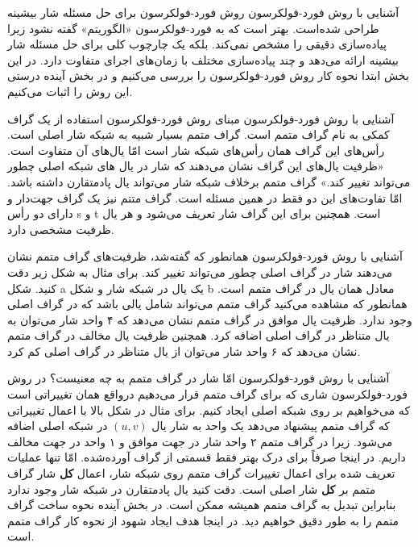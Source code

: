 
\begin{itemframe}{آشنایی با روش فورد-فولکرسون}
\itm
روش فورد-فولکرسون
برای حل مسئله شار بیشینه طراحی شده‌است. بهتر است که به فورد-فولکرسون «الگوریتم» گفته نشود زیرا پیاده‌سازی دقیقی را مشخص نمی‌کند. بلکه یک چارچوب کلی برای حل مسئله شار بیشینه ارائه می‌دهد و چند پیاده‌سازی مختلف با زمان‌های اجرای متفاوت دارد.
\itm
در این بخش ابتدا نحوه کار روش فورد-فولکرسون را بررسی می‌کنیم و در بخش آینده درستی این روش را اثبات می‌کنیم.
\end{itemframe}


\begin{itemframe}{آشنایی با روش فورد-فولکرسون}
\itm
مبنای روش فورد-فولکرسون استفاده از یک گراف کمکی به نام گراف متمم
 است. گراف متمم بسیار شبیه به شبکه شار اصلی است. رأس‌های این گراف همان رأس‌های شبکه شار است امّا یال‌های آن متفاوت است. «ظرفیت یال‌های این گراف نشان می‌دهند که شار در یال های شبکه اصلی چطور می‌تواند تغییر کند.»
\itm
گراف متمم برخلاف شبکه شار می‌تواند یال پادمتقارن داشته باشد. امّا تفاوت‌های این دو فقط در همین مسئله است. گراف متتم نیز یک گراف جهت‌دار و دارای دو رأس s و t است. همچنین برای این گراف شار تعریف می‌شود و هر یال ظرفیت مشخصی دارد.
\end{itemframe}

\begin{itemframe}{آشنایی با روش فورد-فولکرسون}
\itm
همانطور که گفته‌شد، ظرفیت‌های گراف متمم نشان می‌دهند شار در گراف اصلی چطور می‌تواند تغییر کند. برای مثال به شکل زیر دقت کنید. شکل a یک یال در شبکه شار و شکل b معادل همان یال در گراف متمم است.
\itm
همانطور که مشاهده می‌کنید گراف متمم می‌تواند شامل یالی باشد که در گراف اصلی وجود ندارد.
\itm
ظرفیت یال موافق در گراف متمم نشان می‌دهد که ۴ واحد شار می‌توان به یال متناظر در گراف اصلی اضافه کرد. همچنین ظرفیت یال مخالف در گراف متمم نشان می‌دهد که ۶ واحد شار می‌توان از یال متناظر در گراف اصلی کم کرد.
\end{itemframe}


\begin{itemframe}{آشنایی با روش فورد-فولکرسون}
\itm
امّا شار در گراف متمم به چه معنیست؟ در روش فورد-فولکرسون شاری که برای گراف متمم قرار می‌دهیم درواقع همان تغییراتی است که می‌خواهیم بر روی شبکه اصلی ایجاد کنیم.
\itm
 برای مثال در شکل بالا با اعمال تغییراتی که گراف متمم پیشنهاد می‌دهد یک واحد به شار یال
$(u, v)$
 در شبکه اصلی اضافه می‌شود. زیرا در گراف متمم ۲ واحد شار در جهت موافق و ۱ واحد در جهت مخالف داریم.
\itm
در اینجا صرفاً برای درک بهتر فقط قسمتی از گراف آورده‌شده. امّا تنها عملیات تعریف شده برای اعمال تغییرات گراف متمم روی شبکه شار، اعمال \textbf{کل} شار گراف متمم بر \textbf{کل} شار اصلی است.
\itm
دقت کنید یال پادمتقارن در شبکه شار وجود ندارد بنابراین تبدیل به گراف متمم همیشه ممکن است. در بخش آینده نحوه ساخت گراف متمم را به طور دقیق خواهیم دید. در اینجا هدف ایجاد شهود از نحوه کار گراف متمم است.
\end{itemframe}



